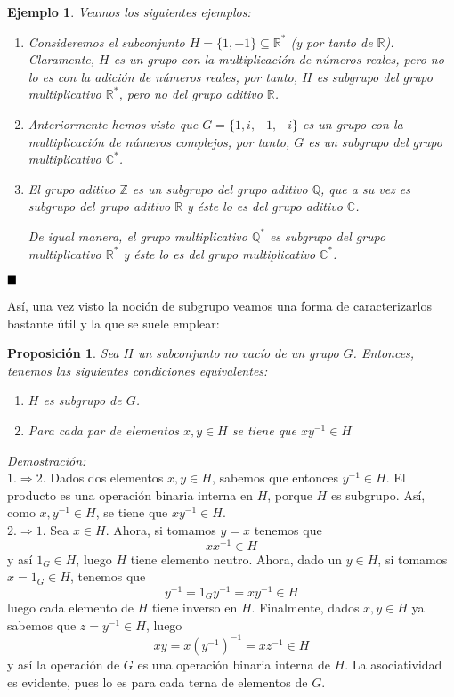 \documentclass[12pt]{article}
\newtheorem{proposition}[theorem]{Proposición}
\newtheorem{example}{Ejemplo}[theorem]
\begin{document}
\begin{example} Veamos los siguientes ejemplos:
\renewcommand{\labelenumi}{\arabic{enumi}.}
\begin{enumerate}
\item Consideremos el subconjunto $H = \lbrace 1,-1 \rbrace \subseteq \mathbb{R^{*}}$ (y por tanto de $\mathbb{R}$). Claramente, $H$ es un grupo con la multiplicación de números reales, pero no lo es con la adición de números reales, por tanto, $H$ es subgrupo del grupo multiplicativo $\mathbb{R^{*}}$, pero no del grupo aditivo $\mathbb{R}$.
\item Anteriormente hemos visto que $ G = \lbrace 1,i,-1,-i\rbrace$ es un grupo con la multiplicación de números complejos, por tanto, $G$ es un subgrupo del grupo multiplicativo $\mathbb{C^{*}}$.
\item El grupo aditivo $\mathbb{Z}$ es un subgrupo del grupo aditivo $\mathbb{Q}$, que a su vez es subgrupo del grupo aditivo $\mathbb{R}$ y éste lo es del grupo aditivo $\mathbb{C}$.


De igual manera, el grupo multiplicativo $\mathbb{Q^{*}}$ es subgrupo del grupo multiplicativo $\mathbb{R^{*}}$ y éste lo es del grupo multiplicativo $\mathbb{C^{*}}$.
\end{enumerate}
\end{example}
$\hfill \blacksquare$


Así, una vez visto la noción de subgrupo veamos una forma de caracterizarlos bastante útil y la que se suele emplear: 
\begin{proposition} \label{eq:condsub} Sea $H$ un subconjunto no vacío de un grupo $G$. Entonces, tenemos las siguientes condiciones equivalentes:
\begin{enumerate}
\item $H$ es subgrupo de $G$.
\item Para cada par de elementos $x,y \in H$ se tiene que $xy^{-1} \in H$
\end{enumerate}
\end{proposition}
\emph{Demostración: } \\
$1. \Rightarrow 2.$ Dados dos elementos $x,y \in H$, sabemos que entonces $y ^{-1} \in H$. El producto es una operación binaria interna en $H$, porque $H$ es subgrupo. Así, como $x, y^{-1} \in H$, se tiene que $xy^{-1} \in H$.\\
$2. \Rightarrow 1.$ Sea $x \in H$. Ahora, si tomamos $y = x$ tenemos que $$xx^{-1} \in H$$ y así $1_{G} \in H$, luego $H$ tiene elemento neutro. Ahora, dado un $y \in H$, si tomamos $x = 1_{G} \in H$, tenemos que $$y^{-1} = 1_{G}y^{-1} = xy^{-1} \in H$$ luego cada elemento de $H$ tiene inverso en $H$. Finalmente, dados $x,y \in H$ ya sabemos que $z = y^{-1} \in H$, luego $$xy = x(y^{-1})^{-1} = xz^{-1} \in H$$ y así la operación de $G$ es una operación binaria interna de $H$. La asociatividad es evidente, pues lo es para cada terna de elementos de $G$.
\end{document}

